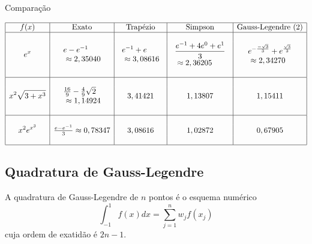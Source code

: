 \begin{ex} Comparação
  \begin{small}
$$\begin{array}{|c|c|c|c|c|}
\hline
f(x)&\hbox{Exato}&\hbox{Trapézio} &\hbox{Simpson} & \hbox{Gauss-Legendre (2)}\\
\hline
&&&&\\
\displaystyle e^{x}&\displaystyle \begin{array}{l}e-e^{-1}\\~\approx 2,35040\end{array}  & \displaystyle \begin{array}{l}e^{-1}+e \\ ~\approx 3,08616 \end{array}& \begin{array}{l}\displaystyle \frac{e^{-1}+4e^{0}+e^{1}}{3}\\ ~\approx  2,36205\end{array} & \begin{array}{l}\displaystyle e^{-\frac{-\sqrt{3}}{3}}+e^{\frac{\sqrt{3}}{3}}\\ ~\approx   2,34270\end{array}\\
&&&&\\
 \hline
&&&&\\
\displaystyle x^2\sqrt{3+x^3}& \begin{array}{l}\frac{16}{9}-\frac{4}{9}\sqrt{2}\\~\approx 1,14924\end{array} & 3,41421  & 1,13807 & 1,15411\\
&&&&\\
 \hline
&&&&\\
  \displaystyle x^2e^{x^3}&\frac{e-e^{-1}}{3}\approx 0,78347 & 3,08616     & 1,02872  & 0,67905\\
&&&&\\
 \hline
    \end{array}
$$    
  \end{small}
\end{ex}

\subsection{Quadratura de Gauss-Legendre}

A quadratura de Gauss-Legendre de $n$ pontos é o esquema numérico
$$\int_{-1}^1 f(x)dx =\sum_{j=1}^n w_j f(x_j)$$
cuja ordem de exatidão é $2n-1$.

